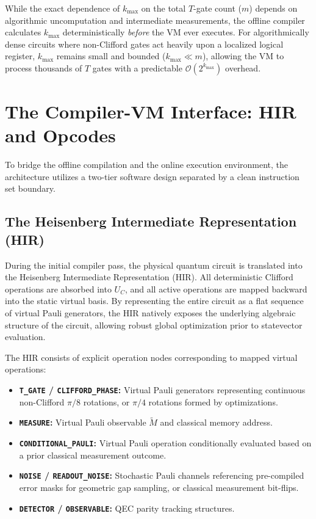 \documentclass[11pt]{article}
\begin{document}
While the exact dependence of $k_{\max}$ on the total $T$-gate count ($m$) depends on algorithmic uncomputation and intermediate measurements, the offline compiler calculates $k_{\max}$ deterministically \textit{before} the VM ever executes. For algorithmically dense circuits where non-Clifford gates act heavily upon a localized logical register, $k_{\max}$ remains small and bounded ($k_{\max} \ll m$), allowing the VM to process thousands of $T$ gates with a predictable $\mathcal{O}(2^{k_{\max}})$ overhead.

\section{The Compiler-VM Interface: HIR and Opcodes}
\label{sec:hir_and_vm}

To bridge the offline compilation and the online execution environment, the architecture utilizes a two-tier software design separated by a clean instruction set boundary.

\subsection{The Heisenberg Intermediate Representation (HIR)}

During the initial compiler pass, the physical quantum circuit is translated into the Heisenberg Intermediate Representation (HIR). All deterministic Clifford operations are absorbed into $U_C$, and all active operations are mapped backward into the static virtual basis. By representing the entire circuit as a flat sequence of virtual Pauli generators, the HIR natively exposes the underlying algebraic structure of the circuit, allowing robust global optimization prior to statevector evaluation.

The HIR consists of explicit operation nodes corresponding to mapped virtual operations:
\begin{itemize}
    \item \textbf{\texttt{T\_GATE} / \texttt{CLIFFORD\_PHASE}:} Virtual Pauli generators representing continuous non-Clifford $\pi/8$ rotations, or $\pi/4$ rotations formed by optimizations.
    \item \textbf{\texttt{MEASURE}:} Virtual Pauli observable $\tilde{M}$ and classical memory address.
    \item \textbf{\texttt{CONDITIONAL\_PAULI}:} Virtual Pauli operation conditionally evaluated based on a prior classical measurement outcome.
    \item \textbf{\texttt{NOISE} / \texttt{READOUT\_NOISE}:} Stochastic Pauli channels referencing pre-compiled error masks for geometric gap sampling, or classical measurement bit-flips.
    \item \textbf{\texttt{DETECTOR} / \texttt{OBSERVABLE}:} QEC parity tracking structures.
\end{itemize}
\end{document}

